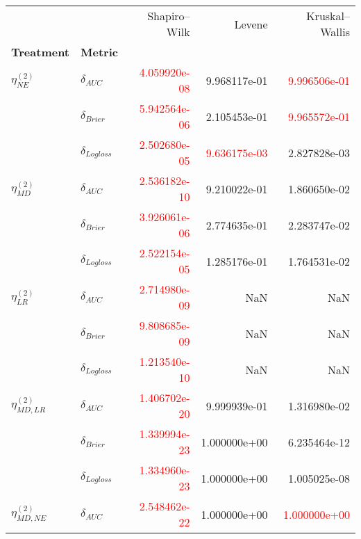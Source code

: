 \begin{table}[!h]
    \centering
    \begin{tabular}{l|lrrr}
        \toprule
                             &         &       Shapiro–Wilk &        Levene &        Kruskal–Wallis \\
        \textbf{Treatment} & \textbf{Metric} &               &               &                \\
        \midrule
        $\eta^{(2)}_{NE}$ & $\delta_{AUC}$ &  \textcolor{red}{4.059920e-08} &  9.968117e-01 &   \textcolor{red}{9.996506e-01} \\
                             & $\delta_{Brier}$ &  \textcolor{red}{5.942564e-06} &  2.105453e-01 &   \textcolor{red}{9.965572e-01} \\
                             & $\delta_{Logloss}$ &  \textcolor{red}{2.502680e-05} &  \textcolor{red}{9.636175e-03} &   2.827828e-03 \\
                             \hline
        $\eta^{(2)}_{MD}$ & $\delta_{AUC}$ &  \textcolor{red}{2.536182e-10} &  9.210022e-01 &   1.860650e-02 \\
                             & $\delta_{Brier}$ &  \textcolor{red}{3.926061e-06} &  2.774635e-01 &   2.283747e-02 \\
                             & $\delta_{Logloss}$ &  \textcolor{red}{2.522154e-05} &  1.285176e-01 &   1.764531e-02 \\
                             \hline
        $\eta^{(2)}_{LR}$ & $\delta_{AUC}$ &  \textcolor{red}{2.714980e-09} &           NaN &            NaN \\
                             & $\delta_{Brier}$ &  \textcolor{red}{9.808685e-09} &           NaN &            NaN \\
                             & $\delta_{Logloss}$ &  \textcolor{red}{1.213540e-10} &           NaN &            NaN \\
                             \hline
        $\eta^{(2)}_{MD, LR}$ & $\delta_{AUC}$ &  \textcolor{red}{1.406702e-20} &  9.999939e-01 &   1.316980e-02 \\
                             & $\delta_{Brier}$ &  \textcolor{red}{1.339994e-23} &  1.000000e+00 &   6.235464e-12 \\
                             & $\delta_{Logloss}$ &  \textcolor{red}{1.334960e-23} &  1.000000e+00 &   1.005025e-08 \\
                             \hline
       $\eta^{(2)}_{MD, NE}$ & $\delta_{AUC}$ &  \textcolor{red}{2.548462e-22} &  1.000000e+00 &   \textcolor{red}{1.000000e+00} \\

\end{tabular}
\end{table}
